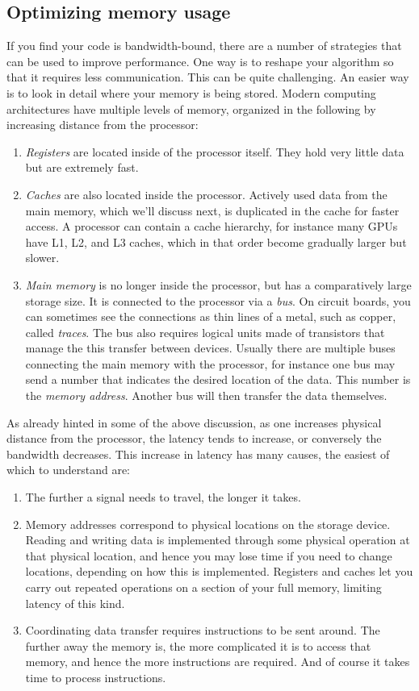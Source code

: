 \subsection{Optimizing memory usage}\label{sec:memory}

If you find your code is bandwidth-bound, there are a number of strategies that
can be used to improve performance. One way is to reshape your algorithm so that
it requires less communication. This can be quite challenging. An easier way is
to look in detail where your memory is being stored. Modern computing
architectures have multiple levels of memory, organized in the following by
increasing distance from the processor:
\begin{enumerate}
  \item {\it Registers} are located inside of the processor
itself. They hold very little data but are extremely fast.
  \item {\it Caches} are also located inside the processor.
Actively used data from the main memory, which we'll discuss next, is duplicated
in the cache for faster access. A processor can contain a cache hierarchy, for
instance many GPUs have L1, L2, and L3 caches, which in that order become
gradually larger but slower.
  \item {\it Main memory} is no longer inside the processor,
but has a comparatively large storage size. It is connected to the processor
via a {\it bus}. On circuit boards, you can sometimes see the 
connections as thin lines of a metal, such as copper, called {\it
traces}. The bus also requires logical units made of transistors
that manage the this transfer between devices.
Usually there are multiple buses connecting the main
memory with the processor, for instance one bus may send a number that indicates
the desired location of the data. This number is the {\it memory address}.
Another bus will then transfer the data themselves.
\end{enumerate}
As already hinted in some of the above discussion, as one increases physical
distance from the processor, the latency tends to increase, or conversely the
bandwidth decreases. This increase in latency has many causes, the easiest of
which to understand are:
\begin{enumerate}
  \item The further a signal needs to travel, the longer it takes.
  \item Memory addresses correspond to physical locations on the storage device.
Reading and writing data is implemented through some physical operation at that
physical location, and hence you may lose time if you need to change locations,
depending on how this is implemented. Registers and caches let you carry out
repeated operations on a section of your full memory, limiting latency of this kind.
  \item Coordinating data transfer requires instructions to be sent around. The
further away the memory is, the more complicated it is to access that memory,
and hence the more instructions are required. And of course it takes time to
process instructions.
\end{enumerate}

